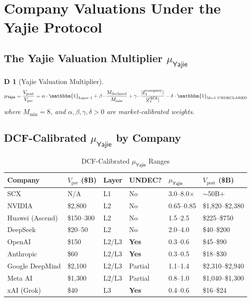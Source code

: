 \documentclass[12pt,a4paper]{article}
\newtheorem{definition}[theorem]Definition
\theoremstyle{remark}
\newcommand{\SCX}{\textsf{SCX}}
\newcommand{\Yajie}{\textsf{Yajie}}
\begin{document}
\section{Company Valuations Under the Yajie Protocol}
\subsection{The Yajie Valuation Multiplier \(\mu_{\Yajie}\)}
\begin{definition}[Yajie Valuation Multiplier]
\begin{equation}
\mu_{\Yajie} = \frac{V_{\text{post}}}{V_{\text{pre}}} 
= \alpha \cdot \mathbbm{1}_{\text{Layer 1}}
+ \beta \cdot \frac{M_{\text{declared}}}{M_{\min}}
+ \gamma \cdot \frac{|\mathcal{E}_t^{\text{company}}|}{|\mathcal{E}_t^{\SCX}|}
- \delta \cdot \mathbbm{1}_{\text{M=1 UNDECLARED}}
\end{equation}
where \(M_{\min}=8\), and \(\alpha, \beta, \gamma, \delta > 0\) are market-calibrated weights.
\end{definition}

\subsection{DCF-Calibrated \(\mu_{\Yajie}\) by Company}
\begin{longtable}{@{}p{2.2cm} p{1.8cm} p{1.6cm} p{1.8cm} p{2cm} p{2cm}@{}}
\caption{DCF-Calibrated \(\mu_{\Yajie}\) Ranges}
\toprule
\textbf{Company} & \textbf{\(V_{\text{pre}}\) (\$B)} & \textbf{Layer} & \textbf{UNDEC?} & \textbf{\(\mu_{\Yajie}\)} & \textbf{\(V_{\text{post}}\) (\$B)} \\
\midrule
SCX & N/A & L1 & No & 3.0--8.0\(\times\) & \(\sim\)50B+ \\
NVIDIA & \$2,800 & L2 & No & 0.65--0.85 & \$1,820--\$2,380 \\
Huawei (Ascend) & \$150--300 & L2 & No & 1.5--2.5 & \$225--\$750 \\
DeepSeek & \$20--50 & L2 & No & 2.0--4.0 & \$40--\$200 \\
OpenAI & \$150 & L2/L3 & \textbf{Yes} & 0.3--0.6 & \$45--\$90 \\
Anthropic & \$60 & L2/L3 & \textbf{Yes} & 0.3--0.5 & \$18--\$30 \\
Google DeepMind & \$2,100 & L2/L3 & Partial & 1.1--1.4 & \$2,310--\$2,940 \\
Meta AI & \$1,300 & L2/L3 & Partial & 0.8--1.0 & \$1,040--\$1,300 \\
xAI (Grok) & \$40 & L3 & \textbf{Yes} & 0.4--0.6 & \$16--\$24 \\
\bottomrule
\end{longtable}
\end{document}
